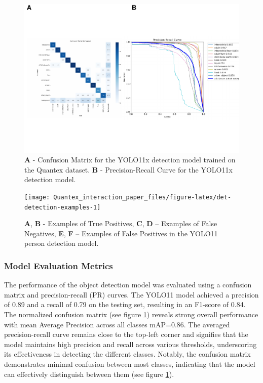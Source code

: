 \documentclass[
  man,floatsintext]{apa6}
\begin{document}
\begin{figure}

{\centering \includegraphics{Quantex_interaction_paper_files/figure-latex/det-metrics-1} 

}

\caption{\textbf{A} - Confusion Matrix for the YOLO11x detection model trained on the Quantex dataset. \textbf{B} - Precision-Recall Curve for the YOLO11x detection model.}\label{fig:det-metrics}
\end{figure}

\begin{figure}

{\centering \texttt{[image: Quantex\_interaction\_paper\_files/figure-latex/det-detection-examples-1]} 

}

\caption{\textbf{A}, \textbf{B} - Examples of True Positives, \textbf{C}, \textbf{D} – Examples of False Negatives, \textbf{E}, \textbf{F} – Examples of False Positives in the YOLO11 person detection model.}\label{fig:det-detection-examples}
\end{figure}

\subsubsection{Model Evaluation Metrics}\label{model-evaluation-metrics}

The performance of the object detection model was evaluated using a confusion matrix and precision-recall (PR) curves. The YOLO11 model achieved a precision of 0.89 and a recall of 0.79 on the testing set, resulting in an F1-score of 0.84. The normalized confusion matrix (see figure \ref{fig:det-metrics}) reveals strong overall performance with mean Average Precision across all classes mAP=0.86. The averaged precision-recall curve remains close to the top-left corner and signifies that the model maintains high precision and recall across various thresholds, underscoring its effectiveness in detecting the different classes. Notably, the confusion matrix demonstrates minimal confusion between most classes, indicating that the model can effectively distinguish between them (see figure \ref{fig:det-metrics}).
\end{document}
